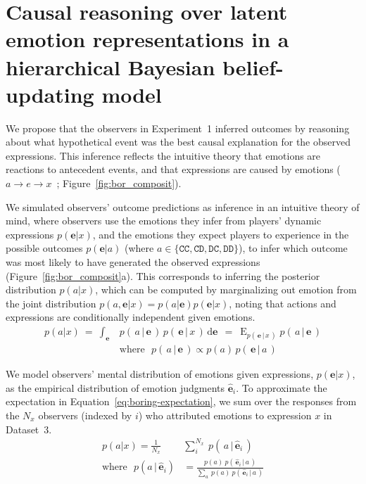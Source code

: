 \documentclass[10pt,letterpaper]{article}
\DeclareMathOperator{\E}{\operatorname {E}}
\newcommand{\CC}{\texttt{CC}\xspace}
\newcommand{\CD}{\texttt{CD}\xspace}
\newcommand{\DC}{\texttt{DC}\xspace}
\newcommand{\DD}{\texttt{DD}\xspace}
\begin{document}
\section{Causal reasoning over latent emotion representations in a hierarchical Bayesian belief-updating model} 

We propose that the observers in Experiment~1 inferred outcomes by reasoning about what hypothetical event was the best causal explanation for the observed expressions. This inference reflects the intuitive theory that emotions are reactions to antecedent events, and that expressions are caused by emotions (~$a \rightarrow e \rightarrow x$~; Figure~\ref{fig:bor_composit}). 


We simulated observers' outcome predictions as inference in an intuitive theory of mind, where observers use the emotions they infer from players' dynamic expressions \( p(\bm{e}|x) \), and the emotions they expect players to experience in the possible outcomes \( p( \bm{e}|a ) \) (where \( a \in \big\{ \CC, \CD, \DC, \DD \big\} \)), to infer which outcome was most likely to have generated the observed expressions (Figure~\ref{fig:bor_composit}a). This corresponds to inferring the posterior distribution $p(a|x)$, which can be computed by marginalizing out emotion from the joint distribution $p(a,\bm{e}|x) = p(a|\bm{e})p(\bm{e}|x)$, noting that actions and expressions are conditionally independent given emotions.  
\begin{equation}\label{eq:boring-expectation}
    \begin{split}
        p(a|x) \ =\  \int_{\bm{e}} &p(\, a\, |\, \bm{e}\, ) \, p(\, \bm{e}\, |\, x\, )\, \mathrm{d}\bm{e} \ \: =\ \mathop{\E}_{p(\, \bm{e}\, |\, x\, )} p(\, a\,  |\,  \bm{e} \, )\\ 
        &\text{where }\,\, p(\, a\, |\, \bm{e}\, ) \propto p(a) \, p(\, \bm{e}\, |\, a\, )
    \end{split}
\end{equation}


We model observers' mental distribution of emotions given expressions, $p(\bm{e}|x)$, as the empirical distribution of emotion judgments $\hat{\bm{e}}_i$. To approximate the expectation in Equation~\ref{eq:boring-expectation}, we sum over the responses from the $N_x$ observers (indexed by $i$) who attributed emotions to expression $x$ in Dataset~3. 
\begin{equation}
    \begin{split}
        p(a|x) = \frac{1}{N_x} &\sum_{i}^{N_x}{ \: p(\,a \, | \, \hat{\bm{e}}_i \, ) } \\
        \text{where }\,\,
        p(a \, | \, \hat{\bm{e}}_i) &= \frac{p(a) \: p(\, \hat{\bm{e}}_i\, |\, a \,)}{\sum_{a} \: {p(a) \: p(\, \hat{\bm{e}}_i \, | \, a \,)}}
    \end{split}
\end{equation}
\end{document}
